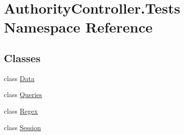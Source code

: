 \hypertarget{namespace_authority_controller_1_1_tests}{}\section{Authority\+Controller.\+Tests Namespace Reference}
\label{namespace_authority_controller_1_1_tests}
\subsection*{Classes}
\begin{DoxyCompactItemize}
\item 
class \mbox{\hyperlink{class_authority_controller_1_1_tests_1_1_data}{Data}}
\item 
class \mbox{\hyperlink{class_authority_controller_1_1_tests_1_1_queries}{Queries}}
\item 
class \mbox{\hyperlink{class_authority_controller_1_1_tests_1_1_regex}{Regex}}
\item 
class \mbox{\hyperlink{class_authority_controller_1_1_tests_1_1_session}{Session}}
\end{DoxyCompactItemize}
